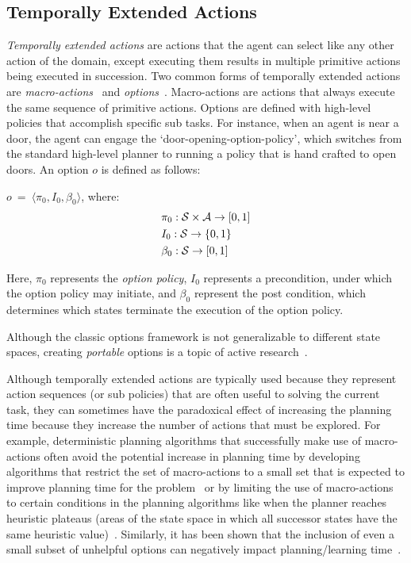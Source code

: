 \documentclass[]{article}
\newcommand{\jmnote}[1]{\textcolor{Green}{\textbf{JM: #1}}}
\begin{document}
\subsection{Temporally Extended Actions}

{\em Temporally extended actions} are actions that the agent can
select like any other action of the domain, except executing them
results in multiple primitive actions being executed in
succession. Two common forms of temporally extended actions are {\em
  macro-actions}%
  ~and {\em
  options}~\citep{sutton99}. Macro-actions are actions that always
execute the same sequence of primitive actions. Options are defined
with high-level policies that accomplish specific sub tasks. For
instance, when an agent is near a door, the agent can engage the
`door-opening-option-policy', which switches from the standard
high-level planner to running a policy that is hand crafted to open
doors. An option $o$ is defined as follows:

$o\ =\ \langle \pi_0, I_0, \beta_0\rangle$, where:
\begin{align*}
&\pi_0 : {\cal S} \times {\cal A} \rightarrow [0,1] \\
&I_0 : {\cal S} \rightarrow \{0,1\} \\
&\beta_0 : {\cal S} \rightarrow [0,1]
\end{align*}

Here, $\pi_0$ represents the {\it option policy}, $I_0$ represents
a precondition, under which the option policy may initiate, and 
$\beta_0$ represent the post condition, which determines which 
states terminate the execution of the option policy.

Although the classic options framework is not generalizable to different state spaces,
creating {\em portable} options is a topic of active research~\citep{konidaris07,konidaris2009efficient,Ravindran03analgebraic,croonenborghs2008learning,andre2002state,konidaris2012transfer}.

Although temporally extended actions are typically used
because they represent action sequences (or sub policies) that are often useful to solving
the current task, they can sometimes have the paradoxical effect
of increasing the planning time because they increase the number of actions that must be explored.
For example, deterministic planning algorithms that successfully make use of macro-actions often avoid the potential increase
in planning time by developing algorithms that restrict the set of macro-actions to a small set that is expected to improve planning time for the problem~\citep{Botea:2005kx,Newton:2005vn} or by limiting the use of macro-actions to certain conditions
in the planning algorithms like when the planner reaches heuristic plateaus (areas of the state space in which all successor states have the same heuristic value)~\cite{Coles:2007ys}. Similarly, it has been shown that the inclusion
of even a small subset of unhelpful options can negatively impact planning/learning time~\cite{Jong:2008zr}.
\end{document}
